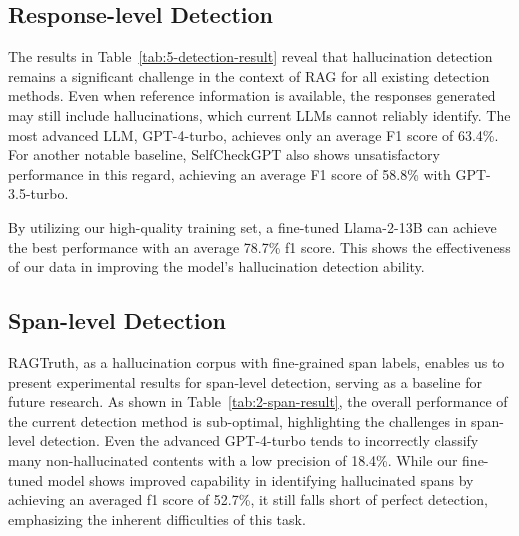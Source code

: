 \documentclass[11pt]{article}
\newcommand{\CorpusName}{RAGTruth}
\begin{document}
\subsection{Response-level Detection}
The results in Table~\ref{tab:5-detection-result} reveal that hallucination detection remains a significant challenge in the context of RAG for all existing detection methods. Even when reference information is available, the responses generated may still include hallucinations, which current LLMs cannot reliably identify. The most advanced LLM, GPT-4-turbo, achieves only an average F1 score of 63.4\%. For another notable baseline, SelfCheckGPT also shows unsatisfactory performance in this regard, achieving an average F1 score of 58.8\% with GPT-3.5-turbo.

By utilizing our high-quality training set, a fine-tuned Llama-2-13B can achieve the best performance with an average 78.7\% f1 score. This shows the effectiveness of our data in improving the model's hallucination detection ability. 


\subsection{Span-level Detection}
{\CorpusName}, as a hallucination corpus with fine-grained span labels, enables us to present experimental results for span-level detection, serving as a baseline for future research. As shown in Table~\ref{tab:2-span-result}, the overall performance of the current detection method is sub-optimal, highlighting the challenges in span-level detection. Even the advanced GPT-4-turbo tends to incorrectly classify many non-hallucinated contents with a low precision of 18.4\%. While our fine-tuned model shows improved capability in identifying hallucinated spans by achieving an averaged f1 score of 52.7\%, it still falls short of perfect detection, emphasizing the inherent difficulties of this task.


\end{document}
